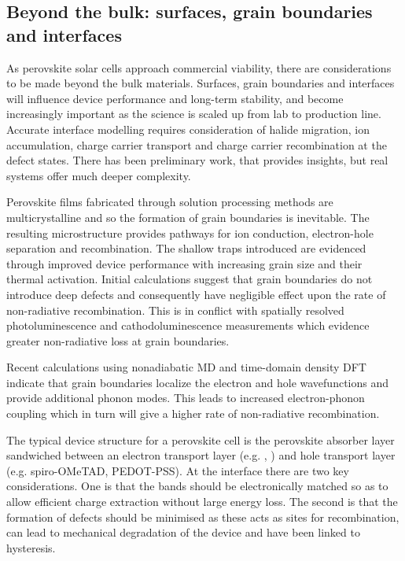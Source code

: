\subsection{Beyond the bulk: surfaces, grain boundaries and interfaces}

As perovskite solar cells approach commercial viability,\autocite{Park2016} there are considerations to be made beyond the bulk materials.
Surfaces, grain boundaries and interfaces will influence device performance and long-term stability, and become increasingly important as the science is scaled up from lab to production line. 
Accurate interface modelling requires consideration of halide migration, ion accumulation, charge carrier transport and charge carrier recombination at the defect states.
There has been preliminary work, that provides insights, but real systems offer much deeper complexity. 

Perovskite films fabricated through solution processing methods are multicrystalline and so the formation of grain boundaries is inevitable.
The resulting microstructure provides pathways for ion conduction, electron-hole separation and recombination.
The shallow traps introduced are evidenced through improved device performance with increasing grain size\autocite{Chen2016} and their thermal activation. %
%
Initial calculations suggest that grain boundaries do not introduce deep defects and consequently have negligible effect upon the rate of non-radiative recombination.\autocite{Yin2015b}
This is in conflict with spatially resolved photoluminescence\autocite{deQuilettes2015a} and cathodoluminescence\autocite{Bischak2015a} measurements which evidence greater non-radiative loss at grain boundaries.

Recent calculations using nonadiabatic MD and time-domain density DFT\autocite{Long2016a} indicate that grain boundaries localize the electron and hole wavefunctions and provide additional phonon modes.
This leads to increased electron-phonon coupling which in turn will give a higher rate of non-radiative recombination. 

The typical device structure for a perovskite cell is the perovskite absorber layer sandwiched between an electron transport layer (e.g. , ) and hole transport layer (e.g. spiro-OMeTAD, PEDOT-PSS).
At the interface there are two key considerations.
One is that the bands should be electronically matched so as to allow efficient charge extraction without large energy loss. 
The second is that the formation of defects should be minimised as these acts as sites for recombination, can lead to mechanical degradation of the device and have been linked to hysteresis.\autocite{Almora2016a}

